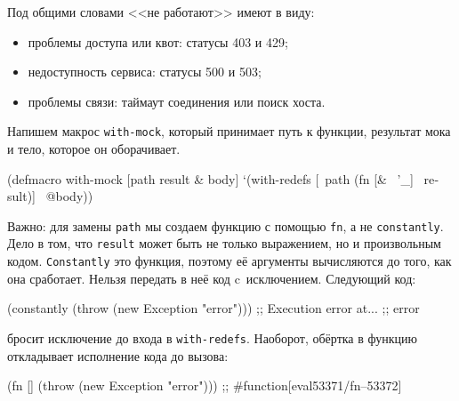 Под общими словами <<не работают>> имеют в виду:


\begin{itemize}

\item
  проблемы доступа или квот: статусы 403 и 429;

\item
  недоступность сервиса: статусы 500 и 503;

\item
  проблемы связи: таймаут соединения или поиск хоста.

\end{itemize}

Напишем макрос \verb|with-mock|, который принимает путь к функции, результат
мока и тело, которое он оборачивает.


\begin{english}
  \begin{clojure}
(defmacro with-mock
  [path result & body]
  `(with-redefs
     [~path (fn [& ~'_] ~result)]
     ~@body))
  \end{clojure}
\end{english}

Важно: для замены \verb|path| мы создаем функцию с помощью \verb|fn|, а не
\verb|constantly|. Дело в том, что \verb|result| может быть не только
выражением, но и произвольным кодом. \verb|Constantly| это функция, поэтому её
аргументы вычисляются до того, как она сработает. Нельзя передать в неё код
c~исключением. Следующий код:

\begin{english}
  \begin{clojure}
(constantly (throw (new Exception "error")))
;; Execution error at...
;; error
  \end{clojure}
\end{english}


\noindent
бросит исключение до входа в \verb|with-redefs|. Наоборот, обёртка в
функцию откладывает исполнение кода до вызова:

\begin{english}
  \begin{clojure}
(fn [] (throw (new Exception "error")))
;; #function[eval53371/fn--53372]
  \end{clojure}
\end{english}

